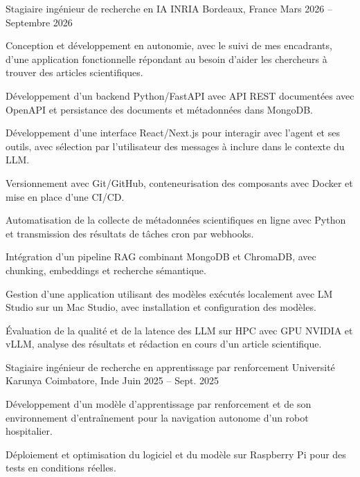 
\begin{cventries}
  \cventry
    {Stagiaire ingénieur de recherche en IA}
    {INRIA}
    {Bordeaux, France}
    {Mars 2026 -- Septembre 2026}
    {
      \begin{cvitems}
        \item {Conception et développement en autonomie, avec le suivi de mes encadrants, d’une application fonctionnelle répondant au besoin d’aider les chercheurs à trouver des articles scientifiques.}
        \item {Développement d’un backend Python/FastAPI avec API REST documentées avec OpenAPI et persistance des documents et métadonnées dans MongoDB.}
        \item {Développement d’une interface React/Next.js pour interagir avec l’agent et ses outils, avec sélection par l’utilisateur des messages à inclure dans le contexte du LLM.}
        \item {Versionnement avec Git/GitHub, conteneurisation des composants avec Docker et mise en place d’une CI/CD.}
        \item {Automatisation de la collecte de métadonnées scientifiques en ligne avec Python et transmission des résultats de tâches cron par webhooks.}
        \item {Intégration d’un pipeline RAG combinant MongoDB et ChromaDB, avec chunking, embeddings et recherche sémantique.}
        \item {Gestion d’une application utilisant des modèles exécutés localement avec LM Studio sur un Mac Studio, avec installation et configuration des modèles.}
        \item {Évaluation de la qualité et de la latence des LLM sur HPC avec GPU NVIDIA et vLLM, analyse des résultats et rédaction en cours d’un article scientifique.}
      \end{cvitems}
    }

  \cventry
    {Stagiaire ingénieur de recherche en apprentissage par renforcement}
    {Université Karunya}
    {Coimbatore, Inde}
    {Juin 2025 -- Sept. 2025}
    {
      \begin{cvitems}
        \item {Développement d’un modèle d’apprentissage par renforcement et de son environnement d’entraînement pour la navigation autonome d’un robot hospitalier.}
        \item {Déploiement et optimisation du logiciel et du modèle sur Raspberry Pi pour des tests en conditions réelles.}
      \end{cvitems}
    }
\end{cventries}
